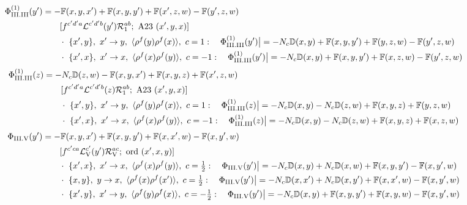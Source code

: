 \documentclass[10pt]{article}
\def\mf#1{\mathbb{#1}}
\begin{document}
\begin{align}
\Phi_{\rm III.III}^{(1)}(y')&=-\mf{F}(x,y,x')+\mf{F}(x,y,y')+\mf{F}(x',z,w)-\mf{F}(y',z,w)\notag\\&\qquad[f^{c'd'a}\mathcal{L}^{c'd'b}(y')\mathcal{R}_{1}^{ab};\ \text{A23}\ (x',y,x)]\notag\\
&\qquad\cdot\ \{x',y\},\ x'\to y,\ \langle\rho^{f}(y)\rho^{f}(x)\rangle,\ c=1:\quad \Phi_{\rm III.III}^{(1)}(y')\big|=-N_{c}\mf{D}(x,y)+\mf{F}(x,y,y')+\mf{F}(y,z,w)-\mf{F}(y',z,w)\notag\\
&\qquad\cdot\ \{x',x\},\ x'\to x,\ \langle\rho^{f}(x)\rho^{f}(y)\rangle,\ c=-1:\quad \Phi_{\rm III.III}^{(1)}(y')\big|=-N_{c}\mf{D}(x,y)+\mf{F}(x,y,y')+\mf{F}(x,z,w)-\mf{F}(y',z,w)\notag
\end{align}
\begin{align}
\Phi_{\rm III.III}^{(1)}(z)&=-N_{c}\mf{D}(z,w)-\mf{F}(x,y,x')+\mf{F}(x,y,z)+\mf{F}(x',z,w)\notag\\&\qquad[f^{c'd'a}\mathcal{L}^{c'd'b}(z)\mathcal{R}_{1}^{ab};\ \text{A23}\ (x',y,x)]\notag\\
&\qquad\cdot\ \{x',y\},\ x'\to y,\ \langle\rho^{f}(y)\rho^{f}(x)\rangle,\ c=1:\quad \Phi_{\rm III.III}^{(1)}(z)\big|=-N_{c}\mf{D}(x,y)-N_{c}\mf{D}(z,w)+\mf{F}(x,y,z)+\mf{F}(y,z,w)\notag\\
&\qquad\cdot\ \{x',x\},\ x'\to x,\ \langle\rho^{f}(x)\rho^{f}(y)\rangle,\ c=-1:\quad \Phi_{\rm III.III}^{(1)}(z)\big|=-N_{c}\mf{D}(x,y)-N_{c}\mf{D}(z,w)+\mf{F}(x,y,z)+\mf{F}(x,z,w)\notag
\end{align}
\begin{align}
\Phi_{\rm III.V}(y')&=-\mf{F}(x,y,x')+\mf{F}(x,y,y')+\mf{F}(x,x',w)-\mf{F}(x,y',w)\notag\\&\qquad[f^{c'ca}\mathcal{L}_{\rm V}^{c'}(y')\mathcal{R}_{\rm V}^{ac};\ \text{ord}\ (x',x,y)]\notag\\
&\qquad\cdot\ \{x',x\},\ x'\to x,\ \langle\rho^{f}(x)\rho^{f}(y)\rangle,\ c=\tfrac{1}{2}:\quad \Phi_{\rm III.V}(y')\big|=-N_{c}\mf{D}(x,y)+N_{c}\mf{D}(x,w)+\mf{F}(x,y,y')-\mf{F}(x,y',w)\notag\\
&\qquad\cdot\ \{x,y\},\ y\to x,\ \langle\rho^{f}(x)\rho^{f}(x')\rangle,\ c=\tfrac{1}{2}:\quad \Phi_{\rm III.V}(y')\big|=-N_{c}\mf{D}(x,x')+N_{c}\mf{D}(x,y')+\mf{F}(x,x',w)-\mf{F}(x,y',w)\notag\\
&\qquad\cdot\ \{x',y\},\ x'\to y,\ \langle\rho^{f}(y)\rho^{f}(x)\rangle,\ c=-\tfrac{1}{2}:\quad \Phi_{\rm III.V}(y')\big|=-N_{c}\mf{D}(x,y)+\mf{F}(x,y,y')+\mf{F}(x,y,w)-\mf{F}(x,y',w)\notag
\end{align}
\end{document}
